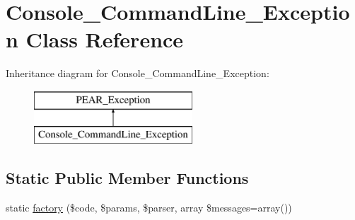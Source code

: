 \hypertarget{class_console___command_line___exception}{
\section{Console\_\-CommandLine\_\-Exception Class Reference}
\label{class_console___command_line___exception}
}
Inheritance diagram for Console\_\-CommandLine\_\-Exception:\begin{figure}[H]
\begin{center}
\leavevmode
\includegraphics[height=2.000000cm]{class_console___command_line___exception}
\end{center}
\end{figure}
\subsection*{Static Public Member Functions}
\begin{DoxyCompactItemize}
\item 
static \hyperlink{class_console___command_line___exception_afc15e5c30381747d754e1bfe4b31912e}{factory} (\$code, \$params, \$parser, array \$messages=array())
\end{DoxyCompactItemize}
